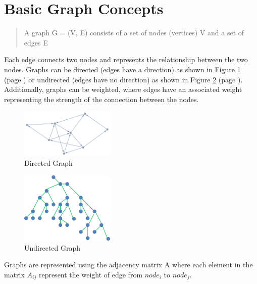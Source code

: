 \section{Basic Graph Concepts}

\begin{quote}
    A graph G = (V, E) consists of a set of nodes (vertices) V and a set of edges E
\end{quote}
    

Each edge connects two nodes and represents the relationship between the two nodes. Graphs can be directed (edges have a direction) as shown in Figure \ref{Directed_Graph} (page \pageref{Directed_Graph}) or undirected (edges have no direction) as shown in Figure \ref{Undirected_Graph} (page \pageref{Undirected_Graph}). Additionally, graphs can be weighted, where edges have an associated weight representing the strength of the connection between the nodes. 


\begin{figure}
     \centering
     \includegraphics[width= 0.4\textwidth]{pics/Directed_Graph.png}
     \caption{Directed Graph}
     \label{Directed_Graph}
\end{figure}

\begin{figure}
     \centering
     \includegraphics[width= 0.4\textwidth]{pics/Undirected_Graph.png}
     \caption{Undirected Graph}
     \label{Undirected_Graph}
\end{figure}

Graphs are represented using the adjacency matrix A where each element in the matrix $A_{ij}$ represent the weight of edge from $node_i$ to $node_j$.

